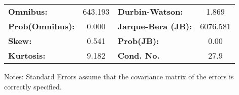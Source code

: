 \begin{center}
\begin{tabular}{lcccccc}
\bottomrule
\end{tabular}
\begin{tabular}{lclc}
\textbf{Omnibus:}       & 643.193 & \textbf{  Durbin-Watson:     } &    1.869  \\
\textbf{Prob(Omnibus):} &   0.000 & \textbf{  Jarque-Bera (JB):  } & 6076.581  \\
\textbf{Skew:}          &   0.541 & \textbf{  Prob(JB):          } &     0.00  \\
\textbf{Kurtosis:}      &   9.182 & \textbf{  Cond. No.          } &     27.9  \\
\bottomrule
\end{tabular}
\end{center}

Notes: \newline
 [1] Standard Errors assume that the covariance matrix of the errors is correctly specified.